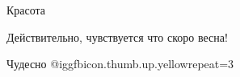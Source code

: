  
 
 
 
 

Красота

Действительно, чувствуется что скоро весна!

Чудесно @igg{fbicon.thumb.up.yellow}{repeat=3} 
